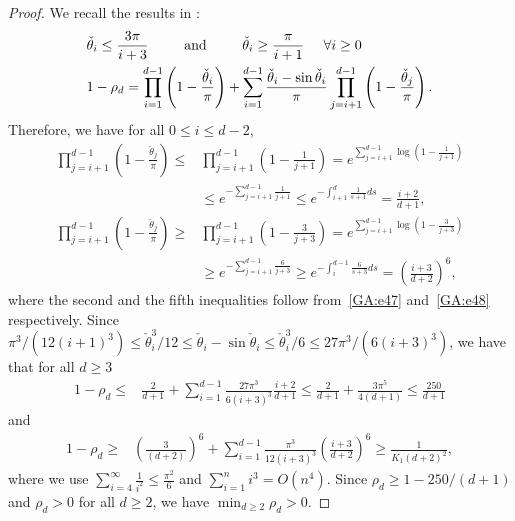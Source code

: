 \begin{proof}
We recall the results in \cite[(36), (37), and (50)]{HV17}:
\begin{align*}
&\check{\theta}_i \leq \frac{3 \pi}{i + 3}\;\;\;\;\;  \;\;\; \hbox{ and }\;\;\;\;\;  \;\;\; \check{\theta}_i \geq \frac{\pi}{i + 1}\;\;\;\;\; \forall i \geq 0 \\
&1 - \rho_d = \prod_{i = 1}^{d - 1} \left( 1 - \frac{\check{\theta}_{i}}{\pi} \right) + \sum_{i = 1}^{d-1} \frac{\check{\theta}_{i} - \sin \check{\theta}_{i}}{\pi} \prod_{j = i+1}^{d-1} \left( 1 - \frac{\check{\theta}_{j}}{\pi} \right).
\end{align*}
Therefore, we have for all $0 \leq i \leq d - 2$,
\begin{align*}
\prod_{j = i+1}^{d-1} \left( 1 - \frac{\check{\theta}_{j}}{\pi} \right) \leq& \prod_{j = i+1}^{d-1} \left( 1 - \frac{1}{j + 1} \right) = e^{\sum_{j = i + 1}^{d - 1} \log\left(1 - \frac{1}{j + 1}\right)} \\
&\leq e^{- \sum_{j = i + 1}^{d - 1}  \frac{1}{j + 1}} \leq e^{- \int_{i + 1}^d \frac{1}{s + 1} d s} = \frac{i + 2}{d + 1}, \\
\prod_{j = i+1}^{d-1} \left( 1 - \frac{\check{\theta}_{j}}{\pi} \right) \geq& \prod_{j = i+1}^{d-1} \left( 1 - \frac{3}{j + 3} \right) = e^{\sum_{j = i + 1}^{d - 1} \log\left(1 - \frac{3}{j + 3}\right)} \\
&\geq e^{- \sum_{j = i + 1}^{d - 1}  \frac{6}{j + 3}} \geq e^{- \int_{i}^{d - 1} \frac{6}{s + 3} d s} = \left(\frac{i + 3}{d + 2}\right)^6,
\end{align*}
where the second and the fifth inequalities follow from~\eqref{GA:e47} and~\eqref{GA:e48} respectively.
Since $\pi^3 / (12 (i + 1)^3) \leq \check{\theta}_{i}^3 / 12 \leq \check{\theta}_{i} - \sin \check{\theta}_{i} \leq \check{\theta}_{i}^3 / 6 \leq 27 \pi^3 / (6 (i + 3)^3)$, we have that for all $d \geq 3$
\begin{align*}
1 - \rho_d \leq& \frac{2}{d + 1} + \sum_{i = 1}^{d - 1} \frac{27 \pi^3}{6 (i + 3)^3} \frac{i + 2}{d + 1} \leq \frac{2}{d + 1} + \frac{3 \pi^5}{4 (d + 1)} \leq \frac{250}{d + 1}
\end{align*}
and
\begin{align*}
1 - \rho_d \geq& \left(\frac{3}{(d+2)}\right)^6 + \sum_{i = 1}^{d - 1} \frac{\pi^3}{12 (i + 3)^3} \left( \frac{i + 3}{d + 2} \right)^6 \geq \frac{1}{K_1 (d + 2)^2},
\end{align*}
where we use $\sum_{i = 4}^\infty \frac{1}{i^2} \leq \frac{\pi^2}{6}$ and $\sum_{i = 1}^n i^3 = O(n^4)$.
Since $\rho_d \geq 1 - 250 / (d+1)$ and $\rho_d > 0$  for all $d \geq 2$, we have $\min_{d \geq 2} \rho_d > 0$.
\end{proof}


